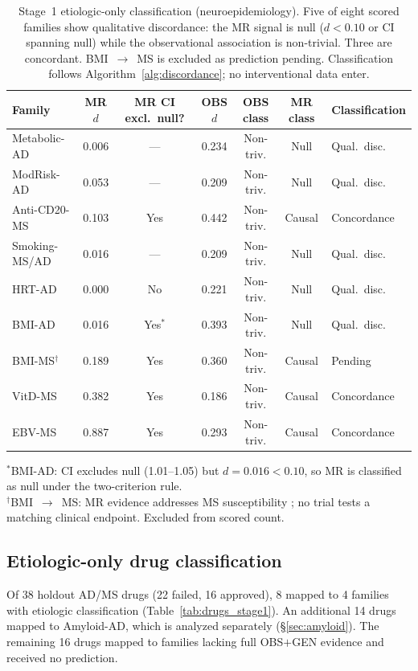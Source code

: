 \documentclass[11pt]{article}
\begin{document}
\begin{table}[t]
\centering
\caption{Stage~1 etiologic-only classification (neuroepidemiology). Five of eight scored families show qualitative discordance: the MR signal is null ($d < 0.10$ or CI spanning null) while the observational association is non-trivial. Three are concordant. BMI~$\to$~MS is excluded as prediction pending. Classification follows Algorithm~\ref{alg:discordance}; no interventional data enter.}
\label{tab:stage1}
\begin{tabular}{lcccccl}
\toprule
Family & MR $d$ & MR CI excl.\ null? & OBS $d$ & OBS class & MR class & Classification \\
\midrule
Metabolic-AD & 0.006 & --- & 0.234 & Non-triv. & Null & Qual.\ disc. \\
ModRisk-AD & 0.053 & --- & 0.209 & Non-triv. & Null & Qual.\ disc. \\
Anti-CD20-MS & 0.103 & Yes & 0.442 & Non-triv. & Causal & Concordance \\
Smoking-MS/AD & 0.016 & --- & 0.209 & Non-triv. & Null & Qual.\ disc. \\
HRT-AD & 0.000 & No & 0.221 & Non-triv. & Null & Qual.\ disc. \\
BMI-AD & 0.016 & Yes$^*$ & 0.393 & Non-triv. & Null & Qual.\ disc. \\
BMI-MS$^\dagger$ & 0.189 & Yes & 0.360 & Non-triv. & Causal & Pending \\
VitD-MS & 0.382 & Yes & 0.186 & Non-triv. & Causal & Concordance \\
EBV-MS & 0.887 & Yes & 0.293 & Non-triv. & Causal & Concordance \\
\bottomrule
\end{tabular}

\vspace{1mm}
{\footnotesize $^*$BMI-AD: CI excludes null (1.01--1.05) but $d = 0.016 < 0.10$, so MR is classified as null under the two-criterion rule.\\
$^\dagger$BMI~$\to$~MS: MR evidence addresses MS susceptibility \cite{mokry2016obesity}; no trial tests a matching clinical endpoint. Excluded from scored count.}
\end{table}

\subsection{Etiologic-only drug classification}

Of 38 holdout AD/MS drugs (22 failed, 16 approved), 8 mapped to 4 families with etiologic classification (Table~\ref{tab:drugs_stage1}). An additional 14 drugs mapped to Amyloid-AD, which is analyzed separately (\S\ref{sec:amyloid}). The remaining 16 drugs mapped to families lacking full OBS$+$GEN evidence and received no prediction.
\end{document}
